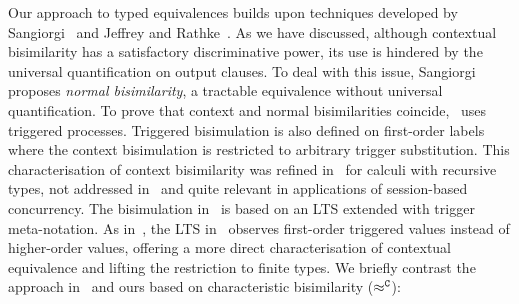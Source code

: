 Our approach %
to typed equivalences
builds upon techniques developed by Sangiorgi~\cite{SangiorgiD:expmpa,San96H}
and Jeffrey and Rathke~\cite{JeffreyR05}.
As we have discussed, although contextual bisimilarity has a satisfactory discriminative power,
its use is hindered by the universal quantification on output clauses.
To deal with this issue, 
Sangiorgi proposes \emph{normal bisimilarity}, 
a tractable  equivalence without universal quantification. 
To prove that context and normal bisimilarities coincide,~\cite{SangiorgiD:expmpa} uses 
triggered processes.
Triggered bisimulation is also defined on first-order labels
where the context bisimulation is restricted to arbitrary
trigger substitution. %
This
characterisation of context bisimilarity  was refined in~\cite{JeffreyR05} for
calculi with recursive types, not addressed in~\cite{San96H,SangiorgiD:expmpa} and
quite relevant in %
applications of session-based concurrency.
The
bisimulation in~\cite{JeffreyR05}
is based on an LTS  extended with trigger meta-notation.
As in~\cite{San96H,SangiorgiD:expmpa}, 
the LTS in~\cite{JeffreyR05}
observes first-order triggered values instead of
higher-order values, offering a more direct characterisation of contextual equivalence
and lifting the restriction to finite types.
We briefly contrast 
the approach in~\cite{JeffreyR05} and ours based on 
characteristic  bisimilarity ($\approx^\mathtt{C}$):
